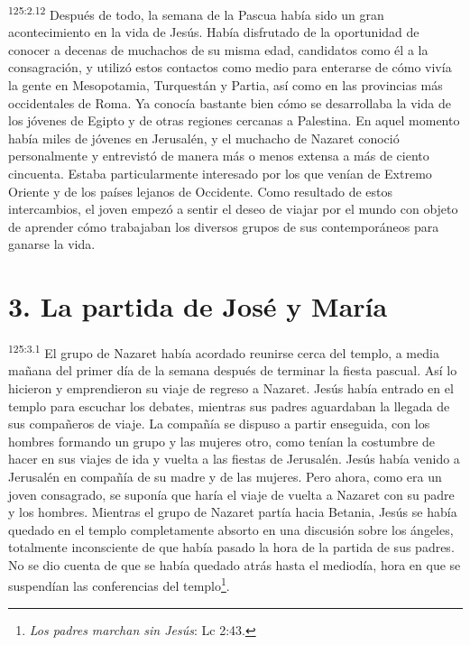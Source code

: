 \par 
\textsuperscript{125:2.12} Después de todo, la semana de la Pascua había sido un gran acontecimiento en la vida de Jesús. Había disfrutado de la oportunidad de conocer a decenas de muchachos de su misma edad, candidatos como él a la consagración, y utilizó estos contactos como medio para enterarse de cómo vivía la gente en Mesopotamia, Turquestán y Partia, así como en las provincias más occidentales de Roma. Ya conocía bastante bien cómo se desarrollaba la vida de los jóvenes de Egipto y de otras regiones cercanas a Palestina. En aquel momento había miles de jóvenes en Jerusalén, y el muchacho de Nazaret conoció personalmente y entrevistó de manera más o menos extensa a más de ciento cincuenta. Estaba particularmente interesado por los que venían de Extremo Oriente y de los países lejanos de Occidente. Como resultado de estos intercambios, el joven empezó a sentir el deseo de viajar por el mundo con objeto de aprender cómo trabajaban los diversos grupos de sus contemporáneos para ganarse la vida.

\section*{3. La partida de José y María}
\par 
\textsuperscript{125:3.1} El grupo de Nazaret había acordado reunirse cerca del templo, a media mañana del primer día de la semana después de terminar la fiesta pascual. Así lo hicieron y emprendieron su viaje de regreso a Nazaret. Jesús había entrado en el templo para escuchar los debates, mientras sus padres aguardaban la llegada de sus compañeros de viaje. La compañía se dispuso a partir enseguida, con los hombres formando un grupo y las mujeres otro, como tenían la costumbre de hacer en sus viajes de ida y vuelta a las fiestas de Jerusalén. Jesús había venido a Jerusalén en compañía de su madre y de las mujeres. Pero ahora, como era un joven consagrado, se suponía que haría el viaje de vuelta a Nazaret con su padre y los hombres. Mientras el grupo de Nazaret partía hacia Betania, Jesús se había quedado en el templo completamente absorto en una discusión sobre los ángeles, totalmente inconsciente de que había pasado la hora de la partida de sus padres. No se dio cuenta de que se había quedado atrás hasta el mediodía, hora en que se suspendían las conferencias del templo\footnote{\textit{Los padres marchan sin Jesús}: Lc 2:43.}.

